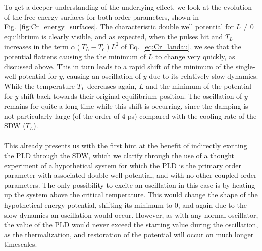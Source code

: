 \\\\
To get a deeper understanding of the underlying effect, we look at the evolution of the free energy surfaces for both order parameters, shown in Fig.~\ref{fig:Cr_energy_surfaces}.
The characteristic double well potential for $L\neq0$ equilibrium is clearly visible, and as expected, when the pulses hit and $T_L$ increases in the term $\alpha(T_L-T_c)L^2$ of Eq.~\eqref{eq:Cr_landau}, we see that the potential flattens causing the the minimum of $L$ to change very quickly, as discussed above.
This in turn leads to a rapid shift of the minimum of the single-well potential for $y$, causing an oscillation of $y$ due to its relatively slow dynamics.
While the temperature $T_L$ decreases again, $L$ and the minimum of the potential for $y$ shift back towards their original equilibrium position.
The oscillation of $y$ remains for quite a long time while this shift is occurring, since the damping is not particularly large (of the order of 4 ps) compared with the cooling rate of the SDW ($T_L$).
\\\\
This already presents us with the first hint at the benefit of indirectly exciting the PLD through the SDW, which we clarify through the use of a thought experiment of a hypothetical system for which the PLD is the primary order parameter with associated double well potential, and with no other coupled order parameters.
The only possibility to excite an oscillation in this case is by heating up the system above the critical temperature.
This would change the shape of the hypothetical energy potential, shifting its minimum to 0, and again due to the slow dynamics an oscillation would occur.
However, as with any normal oscillator, the value of the PLD would never exceed the starting value during the oscillation, as the thermalization, and restoration of the potential will occur on much longer timescales.

